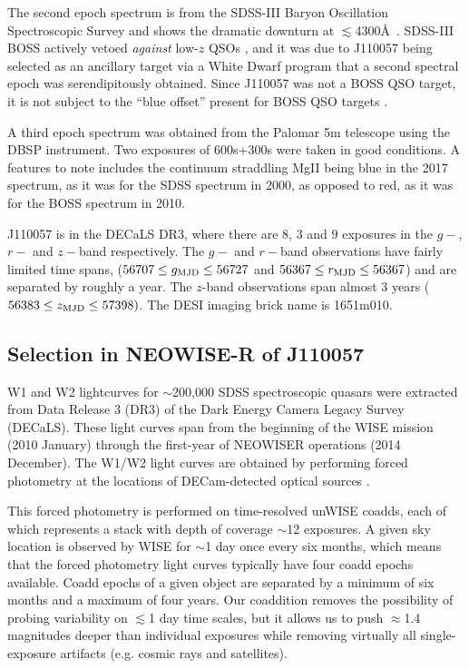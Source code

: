 \documentclass[11pt,a4paper]{article}
\begin{document}
The second epoch spectrum is from the SDSS-III Baryon Oscillation
Spectroscopic Survey \citep[BOSS; ][]{Dawson2013} and shows the dramatic
downturn at $\lesssim$4300\AA\ .  SDSS-III BOSS actively vetoed {\it
against} low-$z$ QSOs \citep{Ross2012}, and it was due to J110057 being
selected as an ancillary target via a White Dwarf program
\citep{Kepler2015, Kepler2016} that a second spectral epoch was serendipitously
obtained.  Since J110057 was not a BOSS QSO target, it is not subject
to the ``blue offset'' present for BOSS QSO targets \citep{Margala2016}.

A third epoch spectrum was obtained from the Palomar 5m telescope
using the DBSP instrument.  Two exposures of 600s+300s were taken in
good conditions.  A features to note includes the continuum straddling
MgII being blue in the 2017 spectrum, as it was for the SDSS spectrum
in 2000, as opposed to red, as it was for the BOSS spectrum in 2010.

J110057 is in the DECaLS DR3, where there are 8, 3 and 9 exposures in
the $g-$, $r-$ and $z-$band respectively. The $g-$ and $r-$band
observations have fairly limited time spans, ($56707 \leq g_{\rm MJD}
\leq 56727$ and $56367 \leq r_{\rm MJD} \leq 56367$) and are separated
by roughly a year. The $z$-band observations span almost 3 years
($56383 \leq z_{\rm MJD} \leq 57398)$.  The DESI imaging brick name is
1651m010.


\subsection*{Selection in NEOWISE-R of J110057}

W1 and W2 lightcurves for $\sim$200,000 SDSS spectroscopic quasars
were extracted from Data Release 3 (DR3) of the Dark Energy Camera
Legacy Survey (DECaLS). These light curves span from the beginning of
the WISE mission (2010 January) through the first-year of NEOWISER
operations (2014 December). The W1/W2 light curves are obtained by
performing forced photometry at the locations of DECam-detected
optical sources \citep{Lang2014, Meisner2017a, Meisner2017b}.

This forced photometry is performed on time-resolved unWISE coadds,
each of which represents a stack with depth of coverage $\sim$12
exposures. A given sky location is observed by WISE for $\sim$1 day
once every six months, which means that the forced photometry light
curves typically have four coadd epochs available. Coadd epochs of a
given object are separated by a minimum of six months and a maximum of
four years. Our coaddition removes the possibility of probing
variability on $\lesssim$1 day time scales, but it allows us to push
$\approx$1.4 magnitudes deeper than individual exposures while removing
virtually all single-exposure artifacts (e.g. cosmic rays and
satellites).
\end{document}
